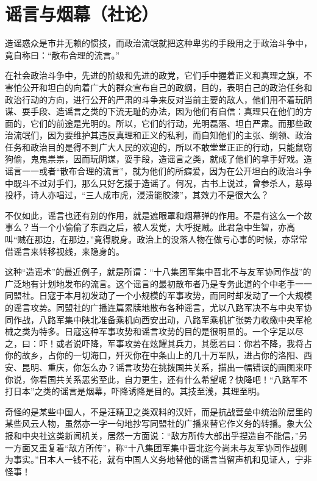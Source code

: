 \section[谣言与烟幕（社论）（一九四一年五月二十八日）]{谣言与烟幕（社论）}


造谣惑众是市井无赖的惯技，而政治流氓就把这种卑劣的手段用之于政治斗争中，竟自称曰：“散布合理的流言。”

在社会政治斗争中，先进的阶级和先进的政党，它们手中握着正义和真理之旗，不害怕公开和坦白的向着广大的群众宣布自己的政纲，目的，表明白己的政治任务和政治行动的方向，进行公开的严肃的斗争来反对当前主要的敌人，他们用不着玩阴谋、耍手段、造谣言之类的下流无耻的办法，因为他们有自信：真理只在他们的方面的，它们的前途是光明的。所以，它们的行动，光明磊落、坦白严肃。而那些政治流氓们，因为要维护其违反真理和正义的私利，而自知他们的主张、纲领、政治任务和政治目的是得不到广大人民的欢迎的，所以不敢堂堂正正的行动，只能鼠窃狗偷，鬼鬼祟祟，因而玩阴谋，耍手段，造谣言之类，就成了他们的拿手好戏。造谣言一一或者“散布合理的流言”，就为他们的所癖爱，因为在公开坦白的政治斗争中既斗不过对手们，那么只好乞援于造谣了。何况，古书上说过，曾参杀人，慈母投杼，诗人亦唱过，“三人成市虎，浸溃能胶漆”，其效力不是很大么？

不仅如此，谣言也还有别的作用，就是遮眼罩和烟幕弹的作用。不是有这么一个故事么？当一个小偷偷了东西之后，被人发觉，大呼捉贼。此君急中生智，亦高叫“贼在那边，在那边，”竟得脱身。政治上的没落人物在做亏心事的时候，亦常常借谣言来转移视线，来隐身的。

这种“造谣术”的最近例子，就是所谓：“十八集团军集中晋北不与友军协同作战”的广泛地有计划地发布的流言。这个谣言的最初散布者乃是专务此道的个中老手一一同盟社。日寇于本月初发动了一个小规模的军事攻势，而同时却发动了一个大规模的谣言攻势。同盟社的广播连篇累牍地散布各种谣言，尤以八路军决不与中央军协同作战，八路军集中陕北准备乘机向西安出动，八路军乘机扩张势力收缴中央军枪械之类为特多。日寇这种军事攻势和谣言攻势的目的是很明显的。一个字足以尽之，曰：吓！或者说吓降，军事攻势在炫耀其兵力，其愿若曰：你若不降，我将占你的故乡，占你的一切海口，歼灭你在中条山上的几十万军队，进占你的洛阳、西安、昆明、重庆，你怎么办？谣言攻势在挑拨国共关系，描出一幅错误的画图来吓你说，你看国共关系恶劣至此，自力更生，还有什么希望呢？快降吧！“八路军不打日本”之类的谣言是烟幕，吓降诱降是目的。其技至浅，其理至明。

奇怪的是某些中国人，不是汪精卫之类双料的汉奸，而是抗战营垒中统治阶层里的某些风云人物，虽然亦一字一句地抄写同盟社的广播来替它作义务的转播。象大公报和中央社这类新闻机关，居然一方面说：“敌方所传大部出乎揑造自不能信，”另一方面又重复着“敌方所传”，称“十八集团军集中晋北迄今尚未与友军协同作战则为事实。”日本人一钱不花，就有中国人义务地替他的谣言当留声机和见证人，宁非怪事！

